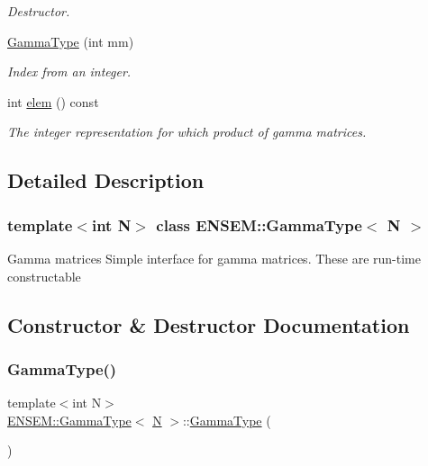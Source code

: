 \begin{DoxyCompactItemize}
\begin{DoxyCompactList}\small\item\em Destructor. \end{DoxyCompactList}\item 
\mbox{\hyperlink{classENSEM_1_1GammaType_ab93a83aeee6b442968d78f30cb6b4a65}{Gamma\+Type}} (int mm)
\begin{DoxyCompactList}\small\item\em Index from an integer. \end{DoxyCompactList}\item 
int \mbox{\hyperlink{classENSEM_1_1GammaType_a2813c3878cd269c7a37c588875682705}{elem}} () const
\begin{DoxyCompactList}\small\item\em The integer representation for which product of gamma matrices. \end{DoxyCompactList}\end{DoxyCompactItemize}


\subsection{Detailed Description}
\subsubsection*{template$<$int N$>$\newline
class E\+N\+S\+E\+M\+::\+Gamma\+Type$<$ N $>$}

Gamma matrices Simple interface for gamma matrices. These are run-\/time constructable 

\subsection{Constructor \& Destructor Documentation}
\mbox{\label{classENSEM_1_1GammaType_a40badc5d1ed98704d66277e171adb121}} 
\subsubsection{\texorpdfstring{GammaType()}{GammaType()}\hspace{0.1cm}{\footnotesize\ttfamily [1/4]}}
{\footnotesize\ttfamily template$<$int N$>$ \\
\mbox{\hyperlink{classENSEM_1_1GammaType}{E\+N\+S\+E\+M\+::\+Gamma\+Type}}$<$ \mbox{\hyperlink{operator__name__util_8cc_a7722c8ecbb62d99aee7ce68b1752f337}{N}} $>$\+::\mbox{\hyperlink{classENSEM_1_1GammaType}{Gamma\+Type}} (\begin{DoxyParamCaption}{ }\end{DoxyParamCaption})\hspace{0.3cm}{\ttfamily [inline]}}



